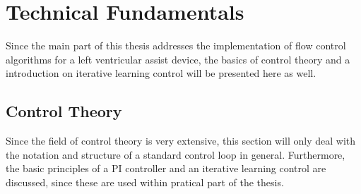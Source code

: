 \chapter{Technical Fundamentals}
Since the main part of this thesis addresses the implementation of flow control algorithms for a left ventricular assist device, the basics of control theory and a introduction on iterative learning control will be presented here as well.

\section{Control Theory}
Since the field of control theory is very extensive, this section will only deal with the notation and structure of a standard control loop in general. Furthermore, the basic principles of a PI controller and an iterative learning control are discussed, since these are used within pratical part of the thesis.


